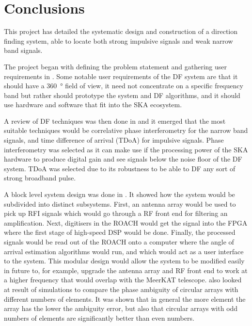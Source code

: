 \chapter{Conclusions}
\label{ch:conclusions}
\graphicspath{{./img/conclusions/}}

This project has detailed the systematic design and construction of a direction finding system, able to locate both strong impulsive signals and weak narrow band signals. 

The project began with defining the problem statement and gathering user requirements in . Some notable user requirements of the DF system are that it should have a \SI{360}{\degree} field of view, it need not concentrate on a specific frequency band but rather should prototype the system and DF algorithms, and it should use hardware and software that fit into the SKA ecosystem. 

A review of DF techniques was then done in  and it emerged that the most suitable techniques would be correlative phase interferometry for the narrow band signals, and time difference of arrival (TDoA) for impulsive signals. Phase interferometry was selected as it can make use if the processing power of the SKA hardware to produce digital gain and see signals below the noise floor of the DF system. TDoA was selected due to its robustness to be able to DF any sort of strong broadband pulse.

A block level system design was done in . It showed how the system would be subdivided into distinct subsystems. First, an antenna array would be used to pick up RFI signals which would go through a RF front end for filtering an amplification. Next, digitisers in the ROACH would get the signal into the FPGA where the first stage of high-speed DSP would be done. Finally, the processed signals would be read out of the ROACH onto a computer where the angle of arrival  estimation algorithms would run, and which would act as a user interface to the system. This modular design would allow the system to be modified easily in future to, for example, upgrade the antenna array and RF front end to work at a higher frequency that would overlap with the MeerKAT telescope.  also looked at result of simulations to compare the phase ambiguity of circular arrays with different numbers of elements. It was shown that in general the more element the array has the lower the ambiguity error, but also that circular arrays with odd numbers of elements are significantly better than even numbers.

